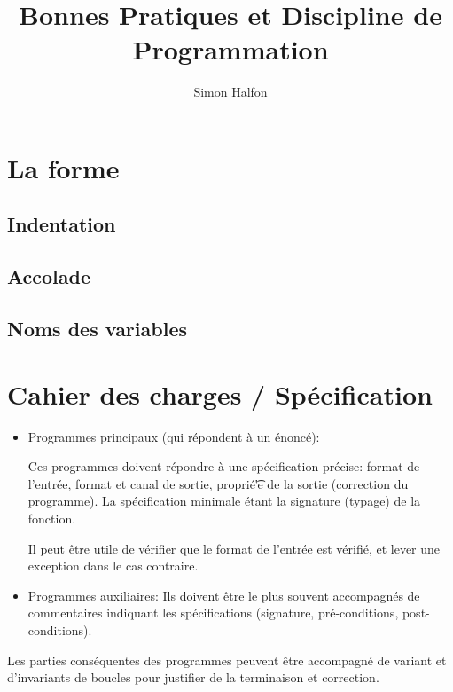 \documentclass{article}
\title{Bonnes Pratiques et Discipline de Programmation}
\author{Simon Halfon}
\begin{document}
\maketitle



\section{La forme}


\subsection{Indentation}

\subsection{Accolade}


\subsection{Noms des variables}


\section{Cahier des charges / Sp\'ecification}

\begin{itemize}
  \item Programmes principaux (qui r\'epondent \`a un \'enonc\'e):

Ces programmes doivent r\'epondre \`a une sp\'ecification pr\'ecise: format de l'entr\'ee, format et canal de sortie, propri\'e\t'e de la sortie (correction du programme).
La sp\'ecification minimale \'etant la signature (typage) de la fonction.

Il peut \^etre utile de v\'erifier que le format de l'entr\'ee est v\'erifi\'e, et lever une exception dans le cas contraire.

\item Programmes auxiliaires:
  Ils doivent \^etre le plus souvent accompagn\'es de commentaires indiquant les sp\'ecifications (signature, pr\'e-conditions, post-conditions).
\end{itemize}
  
Les parties cons\'equentes des programmes peuvent \^etre accompagn\'e de variant et d'invariants de boucles pour justifier de la terminaison et correction.
\end{document}

